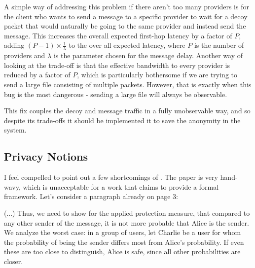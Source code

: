 \documentclass{article}
\begin{document}
A simple way of addressing this problem if there aren't too many providers is for the client who wants to send a message to a specific provider to wait for a decoy packet that would naturally be going to the same provider and instead send the message. This increases the overall expected first-hop latency by a factor of $P$, adding $(P-1)\times\frac{1}{\lambda}$ to the over all expected latency, where $P$ is the number of providers and $\lambda$ is the parameter chosen for the message delay. Another way of looking at the trade-off is that the effective bandwidth to every provider is reduced by a factor of $P$, which is particularly bothersome if we are trying to send a large file consisting of multiple packets. However, that is exactly when this bug is the most dangerous - sending a large file will always be observable.

This fix couples the decoy and message traffic in a fully unobservable way, and so despite its trade-offs it should be implemented it to save the anonymity in the system.


\vfill

\pagebreak
\subsection{Privacy Notions}

I feel compelled to point out a few shortcomings of . The paper is very hand-wavy, which is unacceptable for a work that claims to provide a formal framework. Let's consider a paragraph already on page 3:\bigskip

\parbox{45em}{(...) Thus, we need to show for the applied protection measure, that compared to any other sender of the message, it is not more probable that Alice is the sender. We analyze the worst case: in a group of users, let Charlie be a user for whom the probability of being the sender differs most from Alice's probability. If even these are too close to distinguish, Alice is safe, since all other probabilities are closer.} 
\end{document}
